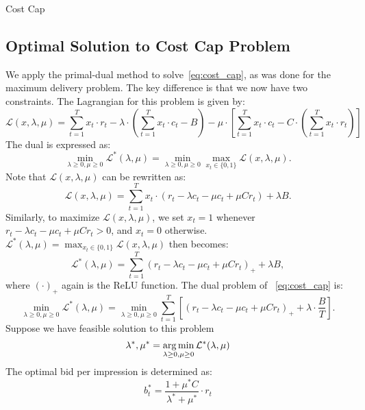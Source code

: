 \documentclass[../main.tex]{subfiles}
\begin{document}
\begin{section}{Cost Cap}
	\subsection* {Optimal Solution to Cost Cap Problem}
	We apply the primal-dual method to solve~\eqref{eq:cost_cap}, as was done for the maximum delivery problem. The key difference is that we now have two constraints. The Lagrangian for this problem is given by:
	\begin{equation*} 
		\mathcal{L}(x, \lambda, \mu) = \sum_{t=1}^T x_t \cdot r_t  - \lambda \cdot \left( \sum_{t=1}^{T} x_t \cdot c_t  - B  \right) - \mu \cdot \left[ \sum_{t=1}^{T} x_t \cdot c_t - C \cdot \left(\sum_{t=1}^{T} x_t \cdot r_t \right) \right] 
	\end{equation*}
	The dual  is expressed as:
	\begin{equation*}
		\min_{\lambda \geq 0, \mu \geq 0} \mathcal{L}^*(\lambda, \mu) = \min_{\lambda \geq 0, \mu \geq 0} \max_{x_t \in \{0,1\}} \mathcal{L}(x, \lambda, \mu).
	\end{equation*}
	Note that \(\mathcal{L}(x, \lambda, \mu)\) can be rewritten as:
	\begin{equation*}
		\mathcal{L}(x, \lambda, \mu) = \sum_{t=1}^T  x_t \cdot (r_t - \lambda c_t - \mu c_t + \mu C r_t)  + \lambda B.
	\end{equation*}
	Similarly, to maximize \(\mathcal{L}(x, \lambda, \mu)\), we set \(x_t = 1\) whenever \(r_t - \lambda c_t - \mu c_t + \mu C r_t  > 0\), and \(x_t = 0\) otherwise. \(\mathcal{L}^*(\lambda, \mu) = \max_{x_t \in \{0,1\}} \mathcal{L}(x, \lambda, \mu)\) then becomes:
	\begin{equation*}
		\mathcal{L}^*(\lambda, \mu) = \sum_{t=1}^{T} (r_t - \lambda c_t - \mu c_t + \mu C r_t)_{+}  + \lambda B,
	\end{equation*}
	where $(\cdot)_{+}$ again is the ReLU function.  The dual problem of ~\eqref{eq:cost_cap} is:
	\begin{equation}
		\label{eq:cost_cap_dual}
		\min_{\lambda \geq 0, \mu \geq 0}  \mathcal{L}^*(\lambda, \mu) = \min_{\lambda \geq 0, \mu \geq 0}  \sum_{t=1}^{T} \left[ (r_t - \lambda c_t - \mu c_t + \mu C r_t)_{+} + \lambda \cdot \frac{B}{T} \right].
	\end{equation}
	Suppose we have feasible solution to this problem 
	\[
	\lambda^*, \mu^* = \operatorname*{arg\,min}_{\lambda \geq 0, \mu \geq 0} \mathcal{L}^*(\lambda, \mu)
	\]
	The optimal bid per impression is determined as: 
	\begin{equation*}
		b_t^* = \frac{1 + \mu^* C }{ \lambda^* + \mu^*} \cdot r_t

\end{equation*}
\end{section}
\end{document}
